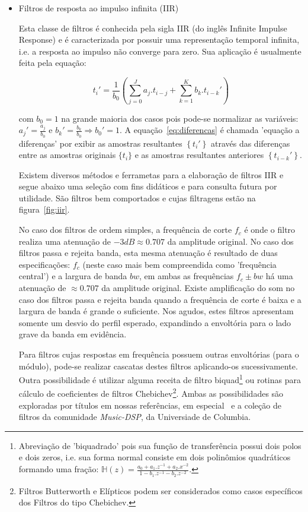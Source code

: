 \begin{itemize}
\item Filtros de resposta ao impulso infinita (IIR)

Esta classe de filtros é
conhecida pela sigla IIR (do inglês Infinite Impulse Response)
e é caracterizada por possuir uma representação temporal
infinita, i.e. a resposta ao impulso não converge para zero.
Sua aplicação é usualmente feita pela equação:

\begin{equation}\label{eq:diferencas}
t_i' = \frac{1}{b_0}\left ( \sum_{j=0}^Ja_j . t_{i-j} + \sum_{k=1}^Kb_k . t_{i-k}' \right )
\end{equation}

com $b_0=1$ na grande maioria dos casos pois pode-se normalizar as variáveis:
$a_j'=\frac{a_j}{b_0}$ e $b_k'=\frac{b_k}{b_0} \Rightarrow b_0' = 1$.
A equação~\ref{eq:diferencas} é chamada 'equação a diferenças' por exibir as amostras resultantes $\left\{t_i'\right\}$
através das diferenças entre as amostras originais $\{t_i\}$ e as amostras resultantes anteriores $\left\{t_{i-k}'\right\}$.

Existem
diversos métodos e ferrametas para a elaboração de filtros IIR
e segue abaixo uma seleção com fins didáticos e para consulta futura por
utilidade.
São filtros bem comportados e cujas
filtragens estão na figura~\ref{fig:iir}.

No caso dos filtros de ordem simples, a frequência de corte $f_c$ é onde 
o filtro realiza uma atenuação de $-3dB \approx 0.707 $ da amplitude original.
No caso dos filtros passa e rejeita banda, esta mesma atenuação é
resultado de duas especificações: $f_c$ (neste caso mais bem compreendida como 'frequência central') e a largura de banda $bw$,
em ambas as frequências $f_c \pm bw$ há uma atenuação de $\approx 0.707$ da amplitude original.
Existe amplificação do som no caso dos filtros passa e rejeita banda quando a frequência
de corte é baixa e a largura de banda é grande o suficiente. Nos agudos, estes filtros apresentam
somente um desvio do perfil esperado, expandindo a envoltória para o lado grave da banda em
evidência.

Para filtros cujas respostas em frequência possuem outras envoltórias (para o módulo),
pode-se realizar cascatas destes filtros aplicando-os sucessivamente.
Outra possibilidade é utilizar alguma receita de filtro
biquad\footnote{Abreviação
de 'biquadrado' pois sua função de transferência possui dois polos e dois zeros, i.e. sua
forma normal consiste em dois polinômios quadráticos formando uma fração:
$\mathbb{H}(z)=\frac{a_0+a_1.z^{-1}+a_2.x^{-2}}{1- b_1.z^{-1} -b_2 . z^{-2}}$.}
ou rotinas para cálculo de coeficientes
de filtros Chebichev\footnote{Filtros Butterworth e Elípticos podem
ser considerados como casos específicos dos Filtros do tipo Chebichev.\cite{Openheim,smith}}.
Ambas as possibilidades são exploradas
por títulos em nossas referências, em especial~\cite{JOSFM,smith} e a coleção de filtros da comunidade \emph{Music-DSP}, da Universiade de Columbia.\cite{music-dsp,Openheim}

\end{itemize}

